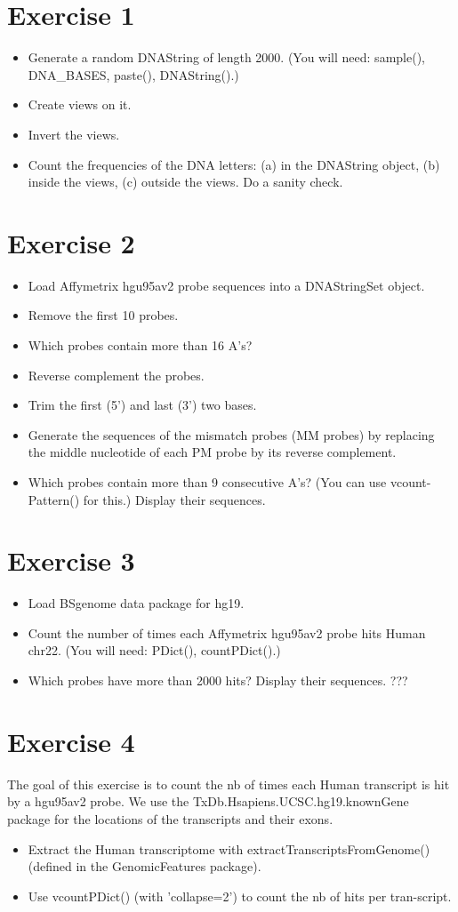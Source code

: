 \documentclass{article}
\begin{document}
\section*{Exercise 1}
\begin{itemize}
\item Generate a random DNAString of length 2000. (You will need: sample(), DNA\_BASES, paste(), DNAString().)
\item Create views on it.
\item Invert the views.
\item Count the frequencies of the DNA letters: (a) in the DNAString object, (b) inside the views, (c) outside the views. Do a sanity check.
\end{itemize}

\section*{Exercise 2}
\begin{itemize}
\item Load Affymetrix hgu95av2 probe sequences into a DNAStringSet object.
\item Remove the first 10 probes.
\item Which probes contain more than 16 A's?
\item Reverse complement the probes.
\item Trim the first (5') and last (3') two bases.
\item Generate the sequences of the mismatch probes (MM probes) by replacing the middle nucleotide of each PM probe by its reverse complement.
\item Which probes contain more than 9 consecutive A's? (You can use vcount- Pattern() for this.) Display their sequences.
\end{itemize}

\section*{Exercise 3}
\begin{itemize}
\item Load BSgenome data package for hg19.
\item Count the number of times each Affymetrix hgu95av2 probe hits Human chr22. (You will need: PDict(), countPDict().)
\item Which probes have more than 2000 hits? Display their sequences.
???\end{itemize}

\section*{Exercise 4}
The goal of this exercise is to count the nb of times each Human transcript is hit by a hgu95av2 probe. We use the TxDb.Hsapiens.UCSC.hg19.knownGene package for the locations of the transcripts and their exons.
\begin{itemize}
\item Extract the Human transcriptome with extractTranscriptsFromGenome() (defined in the GenomicFeatures package).
\item Use vcountPDict() (with 'collapse=2') to count the nb of hits per tran-script.
\end{itemize}
\end{document}
